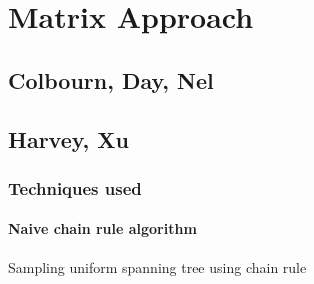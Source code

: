
\chapter{Matrix Approach} %

\label{Chapter4} %

\section{Colbourn, Day, Nel}

\section{Harvey, Xu}

\subsection{Techniques used}



\subsubsection{Naive chain rule algorithm}


\newcommand{\laplacian}[1][G]{\ensuremath{L_{#1}^{+}}}
\newcommand{\reffformula}[1][\laplacian]{\ensuremath{ (\chi_u - \chi_v)^T \  #1 \ (\chi_u - \chi_v) }}
\newcommand{\reff}[1][e]{\ensuremath{R_#1^{\text{eff}}}}
\newcommand{\proj}{\ensuremath{I - \frac{\textbf{1} \textbf{1}^T}{n}}}


\newcommand{\Lim}[1]{\raisebox{0.5ex}{\scalebox{0.8}{$\displaystyle \lim_{#1}\;$}}}


\begin{algorithm}[H]
 
 \caption{Sampling uniform spanning tree using chain rule}
\end{algorithm}

